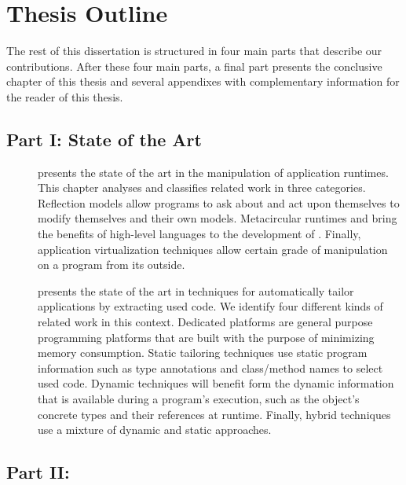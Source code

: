\section{Thesis Outline}

The rest of this dissertation is structured in four main parts that describe our contributions. After these four main parts, a final part presents the conclusive chapter of this thesis and several appendixes with complementary information for the reader of this thesis.

\subsection{Part I: State of the Art}

\begin{description}
\item[] presents the state of the art in the manipulation of application runtimes. This chapter analyses and classifies related work in three categories. Reflection models allow programs to ask about and act upon themselves to modify themselves and their own models. Metacircular runtimes and \VMs bring the benefits of high-level languages to the development of \VMs. Finally, application virtualization techniques allow certain grade of manipulation on a program from its outside.

\item[] presents the state of the art in techniques for automatically tailor applications by extracting used code. We identify four different kinds of related work in this context. Dedicated platforms are general purpose programming platforms that are built with the purpose of minimizing memory consumption. Static tailoring techniques use static program information such as type annotations and class/method names to select used code. Dynamic techniques will benefit form the dynamic information that is available during a program's execution, such as the object's concrete types and their references at runtime. Finally, hybrid techniques use a mixture of dynamic and static approaches.

\end{description}

\subsection{Part II: \VTT}

